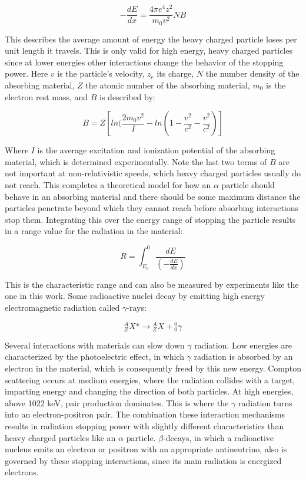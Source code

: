 \begin{equation}
-\frac{dE}{dx} = \frac{4\pi e^{4} z^{2}}{m_{0}v^{2}} NB
\end{equation}

This describes the average amount of energy the heavy charged particle loses per unit length it travels. This is only valid for high energy, heavy charged particles since at lower energies other interactions change the behavior of the stopping power. Here $v$ is the particle’s velocity, $z_e$ its charge, $N$ the number density of the absorbing material, $Z$ the atomic number of the absorbing material, $m_0$ is the electron rest mass, and $B$ is described by:

\begin{equation}
B = Z [ ln(\frac{2m_{0}v^{2}}{I} - ln(1 - \frac{v^2}{c^2} - \frac{v^2}{c^2}) ]
\end{equation}

Where $I$ is the average excitation and ionization potential of the absorbing material, which is determined experimentally. Note the last two terms of $B$ are not important at non-relativistic speeds, which heavy charged particles usually do not reach. This completes a theoretical model for how an $\alpha$ particle should behave in an absorbing material and there should be some maximum distance the particles penetrate beyond which they cannot reach before absorbing interactions stop them. Integrating this over the energy range of stopping the particle results in a range value for the radiation in the material:

\begin{equation}
R = \int_{E_{0}}^{0} \frac{dE}{(-\frac{dE}{dx})}
\end{equation}

This is the characteristic range and can also be measured by experiments like the one in this work. Some radioactive nuclei decay by emitting high energy electromagnetic radiation called $\gamma$-rays:

\begin{equation}
{}^{A}_{Z}X* \rightarrow {}^{A}_{Z}X + {}^{0}_{0}\gamma
\end{equation}

Several interactions with materials can slow down $\gamma$ radiation. Low energies are characterized by the photoelectric effect, in which $\gamma$ radiation is absorbed by an electron in the material, which is consequently freed by this new energy. Compton scattering occurs at medium energies, where the radiation collides with a target, imparting energy and changing the direction of both particles. At high energies, above 1022 keV, pair production dominates. This is where the $\gamma$ radiation turns into an electron-positron pair. The combination these interaction mechanisms results in radiation stopping power with slightly different characteristics than heavy charged particles like an $\alpha$ particle. $\beta$-decays, in which a radioactive nucleus emits an electron or positron with an appropriate antineutrino, also is governed by these stopping interactions, since its main radiation is energized electrons.

